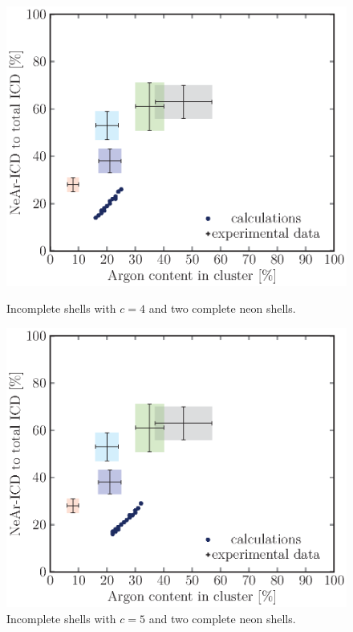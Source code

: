 \begin{figure}[!h]
\begin{minipage}{0.48\textwidth}
    \centering
    \includegraphics[scale=0.5]{pics/incompl02_04.ps}
    \caption{Incomplete shells with $c=4$ and two complete neon shells.}
    \label{incompl01_04_2neon}
\end{minipage}
\hfill
\begin{minipage}{0.48\textwidth}
    \centering
    \includegraphics[scale=0.5]{pics/incompl02_05.ps}
    \caption{Incomplete shells with $c=5$ and two complete neon shells.}
    \label{incompl01_05_2neon}
\end{minipage}
\end{figure}


